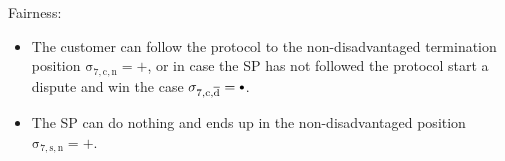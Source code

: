 \documentclass{ieeeaccess}
\newcommand\sbullet[1][.75]{\mathbin{\ThisStyle{\vcenter{\hbox{%
  \scalebox{#1}{$\SavedStyle\bullet$}}}}}%
}
\begin{document}
Fairness:

\begin{itemize}

\item
  The customer can follow the protocol to the non-disadvantaged termination position \(\operatorname{\sigma_{7, c, n} = +}\), or in case the SP has not followed the protocol start a dispute and win the case \(\operatorname{\sigma_{7, c, \overline{d}} = \sbullet}\).
\item
  The SP can do nothing and ends up in the non-disadvantaged position \(\operatorname{\sigma_{7, s, n} = +}\).
\end{itemize}
\end{document}
